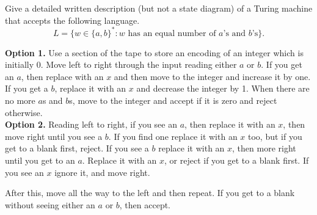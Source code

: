 \documentclass[12pt,answers]{exam}
\begin{document}
\begin{questions}
\begin{solution}
\end{solution}
\vfill


\question Give a detailed written description (but not a state diagram) of a Turing machine that accepts the following language.
$$L = \{ w \in \{a,b\}^* : w \text{ has an equal number of }a\text{'s and }b\text{'s} \}.$$

\begin{solution}
\textbf{Option 1.} Use a section of the tape to store an encoding of an integer which is initially 0.  Move left to right through the input reading either $a$ or $b$.  If you get an $a$, then replace with an $x$ and then move to the integer and increase it by one.  If you get a $b$, replace it with an $x$ and decrease the integer by 1.  When there are no more $a$s and $b$s, move to the integer and accept if it is zero and reject otherwise. \\
 
\textbf{Option 2.} Reading left to right, if you see an $a$, then replace it with an $x$, then move right until you see a $b$.  If you find one replace it with an $x$ too, but if you get to a blank first, reject.  If you see a $b$ replace it with an $x$, then more right until you get to an $a$.  Replace it with an $x$, or reject if you get to a blank first.  If you see an $x$ ignore it, and move right.  

After this, move all the way to the left and then repeat.  If you get to a blank without seeing either an $a$ or $b$, then accept. 
\end{solution}
\vfill


\end{questions}
\end{document}

